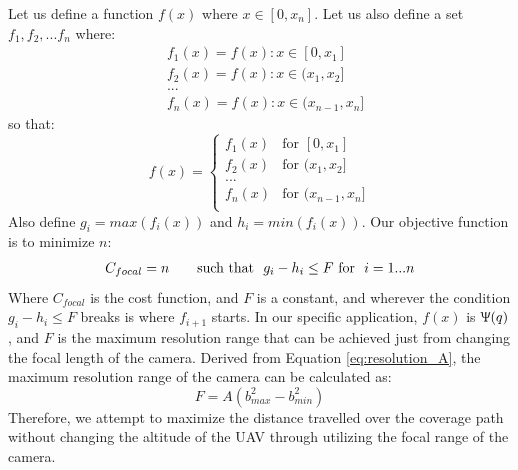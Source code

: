 \documentclass[conference]{IEEEtran}
\theoremstyle{plain}%
\begin{document}
Let us define a function $f(x)$ where $x \in [0, x_n]$. Let us also define a set $f_1, f_2, ... f_n$ where:
\begin{align}
& f_1(x) = f(x) : x \in [0, x_1]\\
& f_2(x) = f(x) : x \in (x_1, x_2]\\
& ... \\
& f_n(x) = f(x) : x \in (x_{n-1}, x_n]
\end{align}
so that:
\begin{equation*}
 f(x)=  \left\{
\begin{array}{ll}
      f_1(x) & \text{for } [0,x_1] \\
      f_2(x) & \text{for } (x_1,x_2] \\
      ...\\
      f_n(x) & \text{for } (x_{n-1},x_n] \\
\end{array} 
\right.
\end{equation*}
Also define $g_i = max(f_i(x))$ and $h_i = min(f_i(x))$.
Our objective function is to minimize $n$:
\begin{gather} \label{eq:focal_cost}
C_{focal} = n
\tag*{\text{such that } $g_i - h_i \leq F$ \text{for } $i = 1...n$}
\end{gather}
Where $C_{focal}$ is the cost function, and $F$ is a constant, and wherever the condition $g_i - h_i \leq F$ breaks is where $f_{i+1}$ starts. In our specific application, $f(x)$ is $\Uppsi(q)$, and $F$ is the maximum resolution range that can be achieved just from changing the focal length of the camera. Derived from Equation \ref{eq:resolution_A}, the maximum resolution range of the camera can be calculated as:
\begin{equation} \label{eq:maxresolutionrange}
F = A(b_{max}^2 - b_{min}^2)
\end{equation}
Therefore, we attempt to maximize the distance travelled over the coverage path without changing the altitude of the UAV through utilizing the focal range of the camera.
\end{document}

